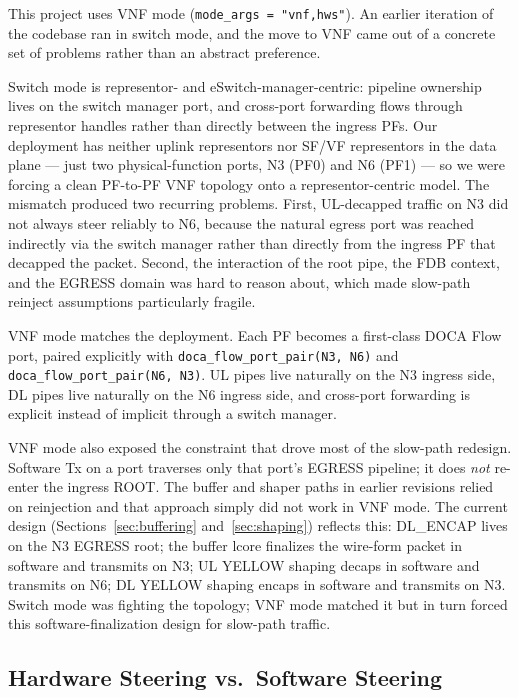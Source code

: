 \documentclass[conference]{IEEEtran}
\newcommand{\code}[1]{\nolinkurl{#1}}
\begin{document}
This project uses VNF mode (\code{mode_args = "vnf,hws"}).  An earlier
iteration of the codebase ran in switch mode, and the move to VNF
came out of a concrete set of problems rather than an abstract
preference.

Switch mode is representor- and eSwitch-manager-centric: pipeline
ownership lives on the switch manager port, and cross-port forwarding
flows through representor handles rather than directly between the
ingress PFs.  Our deployment has neither uplink representors nor
SF/VF representors in the data plane --- just two physical-function
ports, N3 (PF0) and N6 (PF1) --- so we were forcing a clean PF-to-PF
VNF topology onto a representor-centric model.  The mismatch
produced two recurring problems.  First, UL-decapped traffic on N3
did not always steer reliably to N6, because the natural egress
port was reached indirectly via the switch manager rather than
directly from the ingress PF that decapped the packet.  Second, the
interaction of the root pipe, the FDB context, and the EGRESS domain
was hard to reason about, which made slow-path reinject assumptions
particularly fragile.

VNF mode matches the deployment.  Each PF becomes a first-class DOCA
Flow port, paired explicitly with \code{doca_flow_port_pair(N3, N6)}
and \code{doca_flow_port_pair(N6, N3)}.  UL pipes live naturally on
the N3 ingress side, DL pipes live naturally on the N6 ingress side,
and cross-port forwarding is explicit instead of implicit through a
switch manager.

VNF mode also exposed the constraint that drove most of the
slow-path redesign.  Software Tx on a port traverses only that port's
EGRESS pipeline; it does \emph{not} re-enter the ingress ROOT.  The
buffer and shaper paths in earlier revisions relied on reinjection
and that approach simply did not work in VNF mode.  The current
design (Sections~\ref{sec:buffering} and~\ref{sec:shaping}) reflects
this: DL\_ENCAP lives on the N3 EGRESS root; the buffer lcore
finalizes the wire-form packet in software and transmits on N3; UL
YELLOW shaping decaps in software and transmits on N6; DL YELLOW
shaping encaps in software and transmits on N3.  Switch mode was
fighting the topology; VNF mode matched it but in turn forced this
software-finalization design for slow-path traffic.

\subsection{Hardware Steering vs.\ Software Steering}
\end{document}
